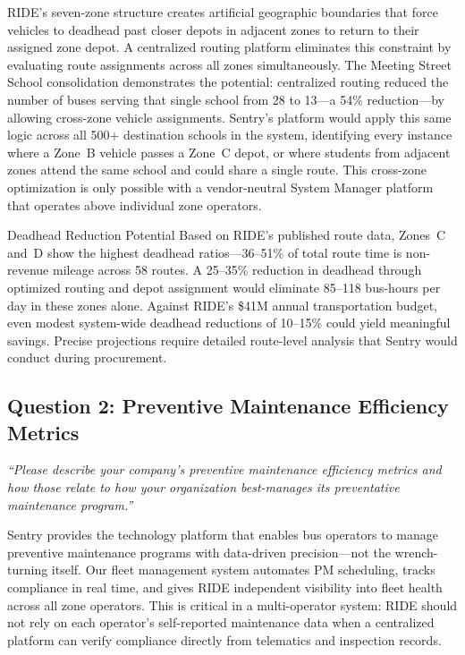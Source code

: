 \begin{description}[style=nextline, leftmargin=0.5cm]
    \item[\faIcon{border-all} \textbf{Cross-Zone Optimization:}] RIDE's seven-zone structure creates artificial geographic boundaries that force vehicles to deadhead past closer depots in adjacent zones to return to their assigned zone depot. A centralized routing platform eliminates this constraint by evaluating route assignments across all zones simultaneously. The Meeting Street School consolidation demonstrates the potential: centralized routing reduced the number of buses serving that single school from 28 to 13---a 54\% reduction---by allowing cross-zone vehicle assignments. Sentry's platform would apply this same logic across all 500+ destination schools in the system, identifying every instance where a Zone~B vehicle passes a Zone~C depot, or where students from adjacent zones attend the same school and could share a single route. This cross-zone optimization is only possible with a vendor-neutral System Manager platform that operates above individual zone operators.
\end{description}

\begin{sidebar}{Deadhead Reduction Potential}
Based on RIDE's published route data, Zones~C and~D show the highest deadhead ratios---36--51\% of total route time is non-revenue mileage across 58 routes. A 25--35\% reduction in deadhead through optimized routing and depot assignment would eliminate 85--118 bus-hours per day in these zones alone. Against RIDE's \$41M annual transportation budget, even modest system-wide deadhead reductions of 10--15\% could yield meaningful savings. Precise projections require detailed route-level analysis that Sentry would conduct during procurement.
\end{sidebar}

\subsection{Question 2: Preventive Maintenance Efficiency Metrics}
\textit{``Please describe your company's preventive maintenance efficiency metrics and how those relate to how your organization best-manages its preventative maintenance program.''}

\vspace{0.3cm}

Sentry provides the technology platform that enables bus operators to manage preventive maintenance programs with data-driven precision---not the wrench-turning itself. Our fleet management system automates PM scheduling, tracks compliance in real time, and gives RIDE independent visibility into fleet health across all zone operators. This is critical in a multi-operator system: RIDE should not rely on each operator's self-reported maintenance data when a centralized platform can verify compliance directly from telematics and inspection records.

